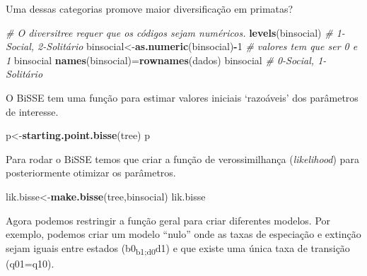 \documentclass[
]{book}
\newenvironment{Shaded}{\begin{snugshade}}{\end{snugshade}}
\newcommand{\CommentTok}[1]{\textcolor[rgb]{0.56,0.35,0.01}{\textit{#1}}}
\newcommand{\DecValTok}[1]{\textcolor[rgb]{0.00,0.00,0.81}{#1}}
\newcommand{\FunctionTok}[1]{\textcolor[rgb]{0.13,0.29,0.53}{\textbf{#1}}}
\newcommand{\NormalTok}[1]{#1}
\newcommand{\OtherTok}[1]{\textcolor[rgb]{0.56,0.35,0.01}{#1}}
\newcommand{\SpecialCharTok}[1]{\textcolor[rgb]{0.81,0.36,0.00}{\textbf{#1}}}
\begin{document}
\begin{Shaded}
\end{Shaded}

Uma dessas categorias promove maior diversificação em primatas?

\begin{Shaded}
\begin{Highlighting}[]
\CommentTok{\# O diversitree requer que os códigos sejam numéricos.}
\FunctionTok{levels}\NormalTok{(binsocial) }\CommentTok{\# 1{-}Social, 2{-}Solitário}
\NormalTok{binsocial}\OtherTok{\textless{}{-}}\FunctionTok{as.numeric}\NormalTok{(binsocial)}\SpecialCharTok{{-}}\DecValTok{1} \CommentTok{\# valores tem que ser 0 e 1}
\NormalTok{binsocial }
\FunctionTok{names}\NormalTok{(binsocial)}\OtherTok{=}\FunctionTok{rownames}\NormalTok{(dados)}
\NormalTok{binsocial }\CommentTok{\# 0{-}Social, 1{-}Solitário}
\end{Highlighting}
\end{Shaded}

O BiSSE tem uma função para estimar valores iniciais `razoáveis' dos parâmetros de interesse.

\begin{Shaded}
\begin{Highlighting}[]
\NormalTok{p}\OtherTok{\textless{}{-}}\FunctionTok{starting.point.bisse}\NormalTok{(tree)}
\NormalTok{p}
\end{Highlighting}
\end{Shaded}

Para rodar o BiSSE temos que criar a função de verossimilhança (\emph{likelihood}) para posteriormente otimizar os parâmetros.

\begin{Shaded}
\begin{Highlighting}[]
\NormalTok{lik.bisse}\OtherTok{\textless{}{-}}\FunctionTok{make.bisse}\NormalTok{(tree,binsocial)}
\NormalTok{lik.bisse}
\end{Highlighting}
\end{Shaded}

Agora podemos restringir a função geral para criar diferentes modelos.
Por exemplo, podemos criar um modelo ``nulo'' onde as taxas de especiação e extinção sejam iguais entre estados (b0\textsubscript{b1;d0}d1) e que existe uma única taxa de transição (q01=q10).
\end{document}
